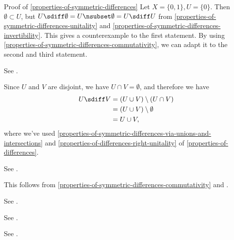 \begin{Proof}{Proof of \cref{properties-of-symmetric-differences}}%
    Let $X = \{0,1\}, U = \{0\}$. Then $\emptyset \subset U$, but
    $U \sdiff \emptyset = U \nsubset \emptyset = U \sdiff U$ from \cref{properties-of-symmetric-differences-unitality} and \cref{properties-of-symmetric-differences-invertibility}. This gives a counterexample to the first statement. By using \cref{properties-of-symmetric-differences-commutativity}, we can adapt it to the second and third statement.

    See \cite{proof-wiki:equivalence-of-definitions-of-symmetric-difference}.

    Since $U$ and $V$ are disjoint, we have $U\cap V=\emptyset$, and therefore we have
    \begin{align*}
        U\sdiff V &= (U\cup V)\setminus(U\cap V)\\
                  &= (U\cup V)\setminus\emptyset\\
                  &= U\cup V,
    \end{align*}
    where we've used \cref{properties-of-symmetric-differences-via-unions-and-intersections} and \cref{properties-of-differences-right-unitality} of \cref{properties-of-differences}.

    See \cite{proof-wiki:symmetric-difference-is-associative}.

    This follows from \cref{properties-of-symmetric-differences-commutativity} and \cite{proof-wiki:symmetric-difference-with-empty-set}.

    See \cite{proof-wiki:symmetric-difference-is-commutative}.

    See \cite{proof-wiki:symmetric-difference-with-self-is-empty-set}.

    See \cite{proof-wiki:union-of-symmetric-differences}.


\end{Proof}
